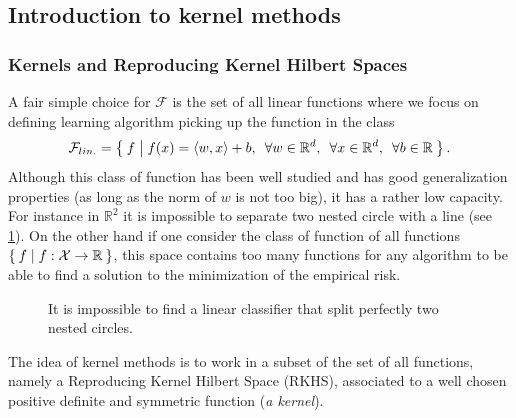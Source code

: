 \subsection{Introduction to kernel methods}\label{subsec:kernels}
\subsubsection{Kernels and Reproducing Kernel Hilbert Spaces}
A fair simple choice for $\mathcal{F}$ is the set of all linear functions where
we focus on defining learning algorithm picking up the  function in
the class
\begin{dmath*}
    \mathcal{F}_{lin.} = \Set{f | f(x) = \inner{w, x} + b, \enskip \forall w \in
    \mathbb{R}^d, \enskip \forall x \in \mathbb{R}^d, \enskip \forall b \in
    \mathbb{R}}.
\end{dmath*}
Although this class of function has been well studied and has good
generalization properties (as long as the norm of $w$ is not too big), it has a
rather low capacity.  For instance in $\mathbb{R}^2$ it is impossible to
separate two nested circle with a line (see \cref{fig:nested_circle}). On the
other hand if one consider the class of function of all functions $\Set{f |
f:\mathcal{X}\to\mathbb{R}}$, this space contains too many functions for any
algorithm to be able to find a solution to the minimization of the empirical
risk.
\begin{figure}
    \centering
    \caption[Separation of nested circles with linear classifier]{It is
    impossible to find a linear classifier that split perfectly two nested
    circles.}
    \label{fig:nested_circle}
\end{figure}
The idea of kernel methods
\citep{Aronszajn1950,KIMELDORF1971,boser1992training,
Berlinet2003,Shawe-TaylorBook} is to work in a subset of the set of all
functions, namely a Reproducing Kernel Hilbert Space (\acl{RKHS}), associated
to a well chosen positive definite and symmetric function (\emph{a kernel}).

